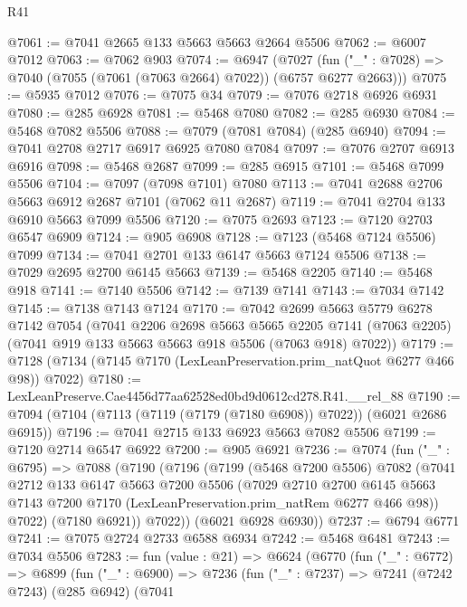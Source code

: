 \begin{lexlean}{R41}
\begin{coremodule}
@7061 := @7041 @2665 @133 @5663 @5663 @2664 @5506
@7062 := @6007 @7012
@7063 := @7062 @903
@7074 := @6947
    (@7027 (fun ("_" : @7028) => @7040 (@7055 (@7061 (@7063 @2664) @7022)) (@6757 @6277 @2663)))
@7075 := @5935 @7012
@7076 := @7075 @34
@7079 := @7076 @2718 @6926 @6931
@7080 := @285 @6928
@7081 := @5468 @7080
@7082 := @285 @6930
@7084 := @5468 @7082 @5506
@7088 := @7079 (@7081 @7084) (@285 @6940)
@7094 := @7041 @2708 @2717 @6917 @6925 @7080 @7084
@7097 := @7076 @2707 @6913 @6916
@7098 := @5468 @2687
@7099 := @285 @6915
@7101 := @5468 @7099 @5506
@7104 := @7097 (@7098 @7101) @7080
@7113 := @7041 @2688 @2706 @5663 @6912 @2687 @7101 (@7062 @11 @2687)
@7119 := @7041 @2704 @133 @6910 @5663 @7099 @5506
@7120 := @7075 @2693
@7123 := @7120 @2703 @6547 @6909
@7124 := @905 @6908
@7128 := @7123 (@5468 @7124 @5506) @7099
@7134 := @7041 @2701 @133 @6147 @5663 @7124 @5506
@7138 := @7029 @2695 @2700 @6145 @5663
@7139 := @5468 @2205
@7140 := @5468 @918
@7141 := @7140 @5506
@7142 := @7139 @7141
@7143 := @7034 @7142
@7145 := @7138 @7143 @7124
@7170 := @7042
    @2699
    @5663
    @5779
    @6278
    @7142
    @7054
    (@7041
      @2206
      @2698
      @5663
      @5665
      @2205
      @7141
      (@7063 @2205)
      (@7041 @919 @133 @5663 @5663 @918 @5506 (@7063 @918) @7022))
@7179 := @7128 (@7134 (@7145 @7170 (LexLeanPreservation.prim_natQuot @6277 @466 @98)) @7022)
@7180 := LexLeanPreserve.Cae4456d77aa62528ed0bd9d0612cd278.R41.__rel_88
@7190 := @7094 (@7104 (@7113 (@7119 (@7179 (@7180 @6908)) @7022)) (@6021 @2686 @6915))
@7196 := @7041 @2715 @133 @6923 @5663 @7082 @5506
@7199 := @7120 @2714 @6547 @6922
@7200 := @905 @6921
@7236 := @7074
    (fun ("_" : @6795) =>
    @7088
      (@7190
        (@7196
          (@7199
            (@5468 @7200 @5506)
            @7082
            (@7041
              @2712
              @133
              @6147
              @5663
              @7200
              @5506
              (@7029
                @2710
                @2700
                @6145
                @5663
                @7143
                @7200
                @7170
                (LexLeanPreservation.prim_natRem @6277 @466 @98))
              @7022)
            (@7180 @6921))
          @7022))
      (@6021 @6928 @6930))
@7237 := @6794 @6771
@7241 := @7075 @2724 @2733 @6588 @6934
@7242 := @5468 @6481
@7243 := @7034 @5506
@7283 := fun (value : @21) =>
  @6624
    (@6770
      (fun ("_" : @6772) =>
      @6899
        (fun ("_" : @6900) =>
        @7236
          (fun ("_" : @7237) =>
          @7241
            (@7242 @7243)
            (@285 @6942)
            (@7041

\end{coremodule}
\end{lexlean}
